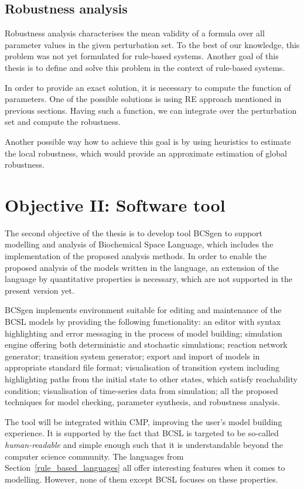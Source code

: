 \documentclass[11pt,a4paper]{report}
\begin{document}
\subsection{Robustness analysis}

Robustness analysis characterises the mean validity of a formula over all parameter values in the given perturbation set. To the best of our knowledge, this problem was not yet formulated for rule-based systems. Another goal of this thesis is to define and solve this problem in the context of rule-based systems. 

In order to provide an exact solution, it is necessary to compute the function of parameters. One of the possible solutions is using RE approach mentioned in previous sections. Having such a function, we can integrate over the perturbation set and compute the robustness. 

Another possible way how to achieve this goal is by using heuristics to estimate the local robustness, which would provide an approximate estimation of global robustness.

\section{Objective II: Software tool}

The second objective of the thesis is to develop tool BCSgen to support modelling and analysis of Biochemical Space Language, which includes the implementation of the proposed analysis methods. In order to enable the proposed analysis of the models written in the language, an extension of the language by quantitative properties is necessary, which are not supported in the present version yet.

BCSgen implements environment suitable for editing and maintenance of the BCSL models by providing the following functionality: an editor with syntax highlighting and error messaging in the process of model building; simulation engine offering both deterministic and stochastic simulations; reaction network generator; transition system generator; export and import of models in appropriate standard file format; visualisation of transition system including highlighting paths from the initial state to other states, which satisfy reachability condition; visualisation of time-series data from simulation; all the proposed techniques for model checking, parameter synthesis, and robustness analysis.

The tool will be integrated within CMP, improving the user's model building experience. It is supported by the fact that BCSL is targeted to be so-called \emph{human-readable} and simple enough such that it is understandable beyond the computer science community. The languages from Section~\ref{rule_based_languages} all offer interesting features when it comes to modelling. However, none of them except BCSL focuses on these properties.
\end{document}
